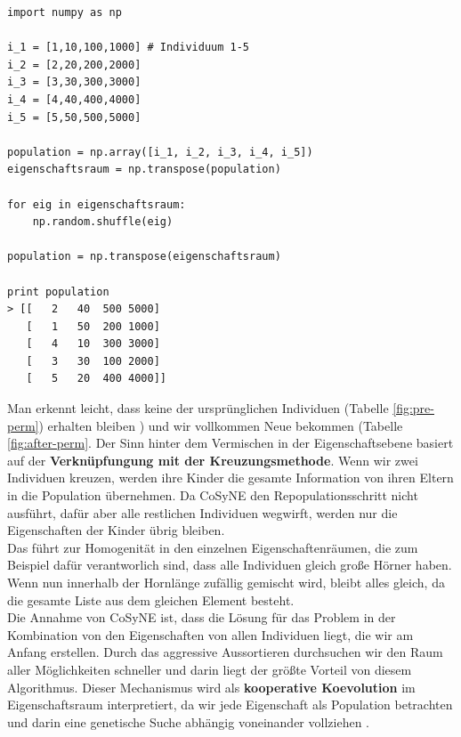             \begin{mdframed}
            \begin{verbatim}
import numpy as np

i_1 = [1,10,100,1000] # Individuum 1-5
i_2 = [2,20,200,2000]
i_3 = [3,30,300,3000]
i_4 = [4,40,400,4000]
i_5 = [5,50,500,5000]

population = np.array([i_1, i_2, i_3, i_4, i_5])
eigenschaftsraum = np.transpose(population)
  
for eig in eigenschaftsraum:
    np.random.shuffle(eig)

population = np.transpose(eigenschaftsraum)

print population
> [[   2   40  500 5000]
   [   1   50  200 1000]
   [   4   10  300 3000]
   [   3   30  100 2000]
   [   5   20  400 4000]]

            \end{verbatim}
            \end{mdframed}
            \noindent
            Man erkennt leicht, dass keine der ursprünglichen Individuen (Tabelle \ref{fig:pre-perm}) erhalten bleiben ) und wir vollkommen Neue bekommen (Tabelle \ref{fig:after-perm}. Der Sinn hinter dem Vermischen in der Eigenschaftsebene basiert auf der \textbf{Verknüpfungung mit der Kreuzungsmethode}. Wenn wir zwei Individuen kreuzen, werden ihre Kinder die gesamte Information von ihren Eltern in die Population übernehmen. Da CoSyNE den Repopulationsschritt nicht ausführt, dafür aber alle restlichen Individuen wegwirft, werden nur die Eigenschaften der Kinder übrig bleiben.\\

            \noindent
            Das führt zur Homogenität in den einzelnen Eigenschaftenräumen, die zum Beispiel dafür verantworlich sind, dass alle Individuen gleich große Hörner haben. Wenn nun innerhalb der Hornlänge zufällig gemischt wird, bleibt alles gleich, da die gesamte Liste aus dem gleichen Element besteht. \\

            \noindent
            Die Annahme von CoSyNE ist, dass die Lösung für das Problem in der Kombination von den Eigenschaften von allen Individuen liegt, die wir am Anfang erstellen. Durch das aggressive Aussortieren durchsuchen wir den Raum aller Möglichkeiten schneller und darin liegt der größte Vorteil von diesem Algorithmus. Dieser Mechanismus wird als \textbf{kooperative Koevolution} im Eigenschaftsraum interpretiert, da wir jede Eigenschaft als Population betrachten und darin eine genetische Suche abhängig voneinander vollziehen \cite{cosyne2}. \\

